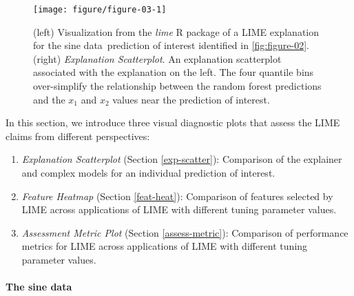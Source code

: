 \documentclass[AMS,STIX2COL]{WileyNJD-v2}\usepackage[]{graphicx}\usepackage[]{color}
\newenvironment{knitrout}{}{} %
\newcommand{\data}{sine data}
\begin{document}
\begin{figure}[!thp]
\begin{knitrout}
\color{fgcolor}

{\centering \texttt{[image: figure/figure-03-1]} 

}



\end{knitrout}
\caption{(left) Visualization from the \emph{lime} R package of a LIME explanation for the \data \ prediction of interest identified in \autoref{fig:figure-02}. (right) \emph{Explanation Scatterplot}.  An explanation scatterplot associated with the explanation  on the left. The four quantile bins over-simplify 
the relationship between the random forest predictions and the $x_1$ and $x_2$ values near the prediction of interest.}
\label{fig:figure-03}
\end{figure}

In this section, we introduce three visual diagnostic plots  that assess the LIME claims from different perspectives:

\begin{enumerate}
\item \emph{Explanation Scatterplot} (Section \ref{exp-scatter}): Comparison of the explainer and complex models for an individual prediction of interest.
\item \emph{Feature Heatmap} (Section \ref{feat-heat}): Comparison of features selected by LIME across applications of LIME with different tuning parameter values.
\item \emph{Assessment Metric Plot} (Section \ref{assess-metric}): Comparison of performance metrics for LIME across applications of LIME with different tuning parameter values. 
\end{enumerate}

\paragraph{The \data}
\end{document}
